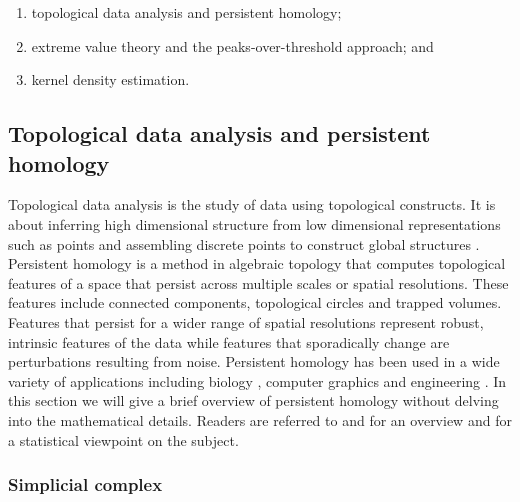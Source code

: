 \documentclass[12pt]{article}
\providecommand{\tightlist}{%
  \setlength{\itemsep}{0pt}\setlength{\parskip}{0pt}}
\theoremstyle{definition}
\theoremstyle{definition}
\theoremstyle{definition}
\theoremstyle{definition}
\theoremstyle{remark}
\begin{document}
\begin{enumerate}
\def\labelenumi{\arabic{enumi}.}
\tightlist
\item
  topological data analysis and persistent homology;
\item
  extreme value theory and the peaks-over-threshold approach; and
\item
  kernel density estimation.
\end{enumerate}

\hypertarget{subsec:tda}{%
\subsection{Topological data analysis and persistent homology}\label{subsec:tda}}

Topological data analysis is the study of data using topological constructs. It is about inferring high dimensional structure from low dimensional representations such as points and assembling discrete points to construct global structures \citep{ghrist2008barcodes}. Persistent homology is a method in algebraic topology that computes topological features of a space that persist across multiple scales or spatial resolutions. These features include connected components, topological circles and trapped volumes. Features that persist for a wider range of spatial resolutions represent robust, intrinsic features of the data while features that sporadically change are perturbations resulting from noise. Persistent homology has been used in a wide variety of applications including biology \citep{topaz2015topological}, computer graphics \citep{carlsson2008local} and engineering \citep{perea2015sliding}. In this section we will give a brief overview of persistent homology without delving into the mathematical details. Readers are referred to \citet{ghrist2008barcodes} and \citet{Carlsson2009} for an overview and \citet{wasserman2018topological} for a statistical viewpoint on the subject.

\hypertarget{simplicial-complex}{%
\subsubsection*{Simplicial complex}\label{simplicial-complex}}
\end{document}
